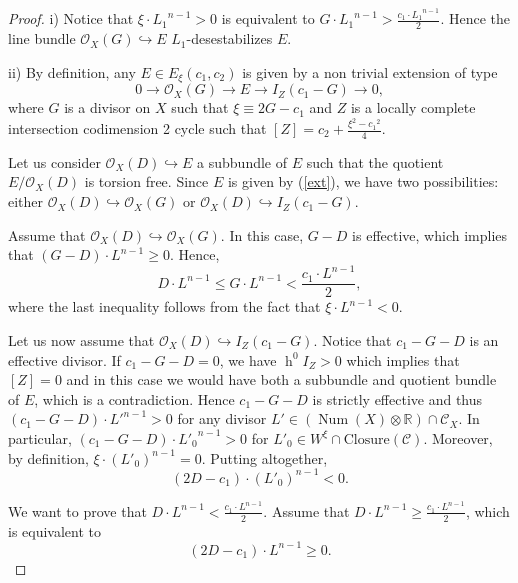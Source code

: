 \documentclass[11pt,twoside]{amsart}
\theoremstyle{definition}
\newcommand {\Closure}{\mathrm{Closure}}
\newcommand{\Num}{\operatorname{Num}}
\newcommand{\h}{\operatorname{h}}
\begin{document}
\begin{proof}




    i) Notice that $\xi\cdot {L_1}^{n-1}>0$ is equivalent to $G\cdot {L_1}^{n-1}>\frac{c_1\cdot {L_1}^{n-1}}{2}$. Hence the line bundle $\mathcal{O}_X(G)\hookrightarrow E$   $L_1$-desestabilizes $E$. 

    ii)  By definition, any $E\in E_{\xi}(c_1,c_2)$ is given by a non trivial extension of type 
    \begin{equation}
        \label{ext}0\rightarrow \mathcal{O}_X(G)\rightarrow E\rightarrow I_Z(c_1-G)\rightarrow0,
    \end{equation}
    where $G$ is a divisor on $X$ such that $\xi\equiv 2G-c_1$ and $Z$ is a locally complete intersection codimension 2 cycle such that $[Z]=c_2+\frac{\xi^2-{c_1}^2}{4}$.

Let us consider $\mathcal{O}_X(D)\hookrightarrow E$ a subbundle of $E$ such that the quotient $E/\mathcal{O}_X(D)$ is torsion free.
Since $E$ is given by (\ref{ext}), we have two possibilities: either $\mathcal{O}_X(D)\hookrightarrow \mathcal{O}_X(G)$ or $\mathcal{O}_X(D)\hookrightarrow I_Z(c_1-G)$.

Assume that $\mathcal{O}_X(D)\hookrightarrow \mathcal{O}_X(G)$. In this case, $G-D$ is effective, which implies that $(G-D)\cdot L^{n-1}\geq 0$. Hence, $$D\cdot L^{n-1}\leq G\cdot L^{n-1}< \frac{c_1\cdot L^{n-1}}{2},$$ where the last inequality follows from the fact that $\xi\cdot L^{n-1}<0$.

Let us now assume that $\mathcal{O}_X(D)\hookrightarrow I_Z(c_1-G)$.
Notice that $c_1-G-D$ is an effective divisor. If $c_1-G-D=0$, %
we have $\h^0I_Z>0$ which implies that $[Z]=0$ and in this case we would have both a subbundle and quotient bundle of $E$, which is a contradiction. Hence $c_1-G-D$ is strictly effective and thus $(c_1-G-D)\cdot {L'}^{n-1}>0$ for any  divisor $L'\in (\Num(X)\otimes \mathbb{R})\cap \mathcal{C}_X$. In particular, $(c_1-G-D)\cdot {L'_0}^{n-1}>0$ for $L'_0\in W^{\xi}\cap \Closure(\mathcal{C})$. Moreover, by definition,  $\xi\cdot (L'_0)^{n-1}=0$. Putting altogether, 
\begin{equation}
    \label{et1}(2D-c_1)\cdot (L'_0)^{n-1}<0.
\end{equation}


We want to prove that $D\cdot L^{n-1}<\frac{c_1\cdot L^{n-1}}{2}$. Assume that $D\cdot L^{n-1}\geq\frac{c_1\cdot L^{n-1}}{2}$, which is equivalent to
\begin{equation}
\label{et2}
    (2D-c_1)\cdot L^{n-1}\geq0.
\end{equation}



\end{proof}
\end{document}

